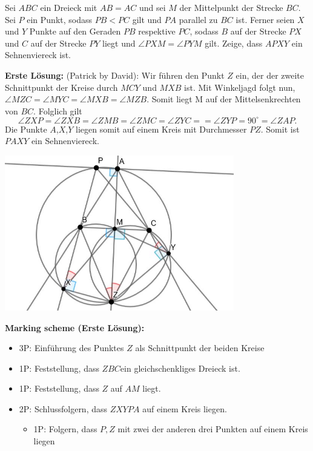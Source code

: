 Sei $ABC$ ein Dreieck mit $AB=AC$ und sei $M$ der Mittelpunkt der Strecke $BC$. Sei $P$ ein Punkt, sodass $PB<PC$ gilt und $PA$ parallel zu $BC$ ist. Ferner seien $X$ und $Y$ Punkte auf den Geraden $PB$ respektive $PC$, sodass $B$ auf der Strecke $PX$ und $C$ auf der Strecke $PY$ liegt und $\angle PXM = \angle PYM$ gilt. Zeige, dass $APXY$ ein Sehnenviereck ist.

\textbf{Erste Lösung:} (Patrick by David):
Wir führen den Punkt $Z$ ein, der der zweite Schnittpunkt der Kreise durch $MCY$ und $MXB$ ist. Mit Winkeljagd folgt nun, $\angle MZC = \angle MYC = \angle MXB = \angle MZB$. Somit liegt M auf der Mittelsenkrechten von $BC$. Folglich gilt 
\[ \angle ZXP = \angle ZXB = \angle ZMB = \angle ZMC = \angle ZYC = = \angle ZYP = 90 ^\circ = \angle ZAP.
\]
Die Punkte $A$,$X$,$Y$ liegen somit auf einem Kreis mit Durchmesser $PZ$. Somit ist $PAXY$ ein Sehnenviereck.

\begin{center}
 \includegraphics[width=10cm]{solutions/s5_picture.JPG}
\end{center}

\textbf{Marking scheme (Erste Lösung):}
\begin{itemize}
\item 3P: Einführung des Punktes $Z$ als Schnittpunkt der beiden Kreise
\item 1P: Feststellung, dass $ZBC $ein gleichschenkliges Dreieck ist.
\item 1P: Feststellung, dass $Z$ auf $AM$ liegt.
\item 2P: Schlussfolgern, dass $ZXYPA$ auf einem Kreis liegen.
\begin{itemize}
    \item 1P: Folgern, dass $P, Z$ mit zwei der anderen drei Punkten auf einem Kreis liegen
\end{itemize}
\end{itemize}
